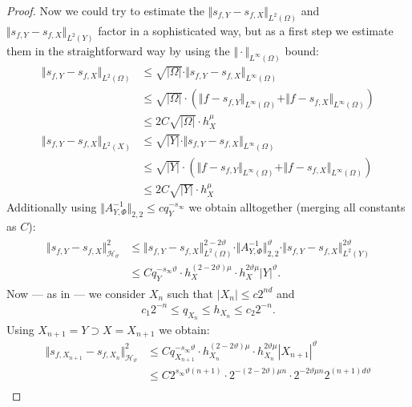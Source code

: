 \documentclass[a4paper, 10pt]{article}
\newcommand{\Ht}{\mathcal{H}_{\vartheta}}
\begin{document}
\begin{proof}
Now we could try to estimate the $\Vert s_{f, Y} - s_{f, X} \Vert_{L^2(\Omega)}$ and $\Vert s_{f, Y} - s_{f, X} \Vert_{L^2(Y)}$ factor in a sophisticated way, but as a first step we estimate them in the straightforward way by using the $\Vert \cdot \Vert_{L^\infty(\Omega)}$ bound:
\begin{align*}
\Vert s_{f, Y} - s_{f, X} \Vert_{L^2(\Omega)} &\leq \sqrt{|\Omega|} \cdot \Vert s_{f, Y} - s_{f, X} \Vert_{L^\infty(\Omega)} \\
&\leq \sqrt{|\Omega|} \cdot \left( \Vert f - s_{f, Y} \Vert_{L^\infty(\Omega)} + \Vert f - s_{f, X} \Vert_{L^\infty(\Omega)} \right) \\ 
&\leq 2C \sqrt{|\Omega|} \cdot h_X^\mu \\
\Vert s_{f, Y} - s_{f, X} \Vert_{L^2(X)} &\leq \sqrt{|Y|} \cdot \Vert s_{f, Y} - s_{f, X} \Vert_{L^\infty(\Omega)} \\
&\leq \sqrt{|Y|} \cdot \left( \Vert f - s_{f, Y} \Vert_{L^\infty(\Omega)} + \Vert f - s_{f, X} \Vert_{L^\infty(\Omega)} \right) \\ 
&\leq 2C \sqrt{|Y|} \cdot h_X^\mu
\end{align*}
Additionally using $\Vert A_{Y, \Phi}^{-1} \Vert_{2,2} \leq c q_Y^{-s_\infty}$ we obtain alltogether (merging all constants as $C$):
\begin{align}
\begin{aligned}
\label{eq:important_estimate}
\Vert s_{f, Y} - s_{f, X} \Vert_{\Ht}^2 &\leq \Vert s_{f, Y} - s_{f, X} \Vert_{L^2(\Omega)}^{2 - 2\vartheta} \cdot \Vert A_{Y, \Phi}^{-1} \Vert_{2,2}^{\vartheta} \cdot \Vert s_{f, Y} - s_{f, X} \Vert_{L^2(Y)}^{2\vartheta} \\
&\leq C q_Y^{-s_\infty \vartheta} \cdot h_X^{(2-2\vartheta)\mu} \cdot h_X^{2\vartheta \mu} |Y|^\vartheta. 
\end{aligned}
\end{align}
Now --- as in \cite{schaback2002inverse} --- we consider $X_n$ such that $|X_n| \leq c 2^{nd}$ and
\begin{align*}
c_1 2^{-n} \leq q_{X_n} \leq h_{X_n} \leq c_2 2^{-n}.
\end{align*}
Using $X_{n+1} = Y \supset X = X_{n+1}$ we obtain:
\begin{align*}
\Vert s_{f, X_{n+1}} - s_{f, X_n} \Vert_{\Ht}^2 &\leq C q_{X_{n+1}}^{-s_\infty \vartheta} \cdot h_{X_{n}}^{(2-2\vartheta)\mu} \cdot h_{X_n}^{2\vartheta \mu} |X_{n+1}|^\vartheta \\
&\leq C 2^{s_\infty \vartheta (n+1)} \cdot 2^{-(2-2\vartheta)\mu n} \cdot 2^{-2\vartheta \mu n} 2^{(n+1)d \vartheta} \\

\end{align*}
\end{proof}
\end{document}
